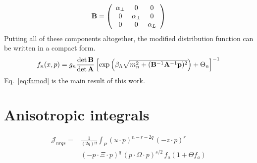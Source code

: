 \documentclass[showpacs,aps,prd,nofootinbib,showkeys,superscriptaddress,twocolumn]{revtex4-1}
\newcommand{\be}{\begin{equation}}
\newcommand{\ee}{\end{equation}}
\newcommand{\n}{\newline}
\newcommand{\pOp}{(p \cdot \Omega \cdot p)}
\newcommand{\J}{\mathcal{J}}
\begin{document}
\be
\bold{B} = \left(
\begin{array}{c c c}
\alpha_\perp & 0 & 0  \\
0 & \alpha_\perp & 0 \\
0 & 0 & \alpha_L \\
\end{array}
\right)
\ee \n
Putting all of these components altogether, the modified distribution function can be written in a compact form. 
\be
\label{eq:famod}
f_n(x,p) = g_n \frac{\det \bold{B}}{\det \bold{A}}\left[\exp\left(\beta_\Lambda \sqrt{m_n^2 + (\bold{B}^{-1}\bold{A}^{-1}\bold{p})^2} \right)+\Theta_n\right]^{-1}
\ee 
Eq.~\eqref{eq:famod} is the main result of this work.
\appendix
\section{Anisotropic integrals}
\label{app:integrals}
\be
\begin{split}
\J_{nrqs} = & \frac{1}{(2q)!!} \int_P (u \cdot p)^{n-r-2q} \, (- z \cdot p)^r \\
& (- p \cdot \Xi \cdot p)^q \, \pOp^{s/2} \, f_a (1 + \Theta f_a)
\end{split}
\ee
\end{document}
